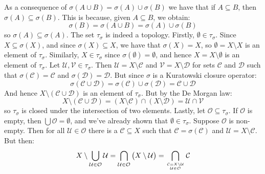 \documentclass{article}
\theoremstyle{normal}
\begin{document}
    \color{black}
    As a consequence of $\sigma(A\cup{B})=\sigma(A)\cup\sigma(B)$ we have
    that if $A\subseteq{B}$, then $\sigma(A)\subseteq\sigma(B)$. This is
    because, given $A\subseteq{B}$, we obtain:
    \begin{equation}
        \sigma(B)=\sigma(A\cup{B})=\sigma(A)\cup\sigma(B)
    \end{equation}
    so $\sigma(A)\subseteq\sigma(A)$. The set $\tau_{\sigma}$ is indeed a
    topology. Firstly, $\emptyset\in\tau_{\sigma}$.
    Since $X\subseteq\sigma(X)$, and since $\sigma(X)\subseteq{X}$, we have
    that $\sigma(X)=X$, so $\emptyset=X\setminus{X}$ is an element of
    $\tau_{\sigma}$. Similarly, $X\in\tau_{\sigma}$ since
    $\sigma(\emptyset)=\emptyset$, and hence $X=X\setminus\emptyset$ is an
    element of $\tau_{\sigma}$. Let $\mathcal{U},\mathcal{V}\in\tau_{\sigma}$.
    Then $\mathcal{U}=X\setminus\mathcal{C}$ and
    $\mathcal{V}=X\setminus\mathcal{D}$ for sets $\mathcal{C}$ and
    $\mathcal{D}$ such that $\sigma(\mathcal{C})=\mathcal{C}$ and
    $\sigma(\mathcal{D})=\mathcal{D}$. But since $\sigma$ is a Kuratowski
    closure operator:
    \begin{equation}
        \sigma(\mathcal{C}\cup\mathcal{D})
        =\sigma(\mathcal{C})\cup\sigma(\mathcal{D})
        =\mathcal{C}\cup\mathcal{D}
    \end{equation}
    And hence $X\setminus(\mathcal{C}\cup\mathcal{D})$ is an element of
    $\tau_{\sigma}$. But by the De Morgan law:
    \begin{equation}
        X\setminus(\mathcal{C}\cup\mathcal{D})
        =(X\setminus\mathcal{C})\cap(X\setminus\mathcal{D})
        =\mathcal{U}\cap\mathcal{V}
    \end{equation}
    so $\tau_{\sigma}$ is closed under the intersection of two elements.
    Lastly, let $\mathcal{O}\subseteq\tau_{\sigma}$. If $\mathcal{O}$ is
    empty, then $\bigcup\mathcal{O}=\emptyset$, and we've already shown that
    $\emptyset\in\tau_{\sigma}$. Suppose $\mathcal{O}$ is non-empty. Then
    for all $\mathcal{U}\in\mathcal{O}$ there is a
    $\mathcal{C}\subseteq{X}$ such that $\mathcal{C}=\sigma(\mathcal{C})$
    and $\mathcal{U}=X\setminus\mathcal{C}$. But then:
    \begin{equation}
        X\setminus\bigcup_{\mathcal{U}\in\mathcal{O}}\mathcal{U}
        =\bigcap_{\mathcal{U}\in\mathcal{O}}\big(X\setminus\mathcal{U}\big)
        =\bigcap_{{\mathcal{C}=X\setminus\mathcal{U}}\atop{\mathcal{U}\in\mathcal{O}}}\mathcal{C}
    \end{equation}
\end{document}
